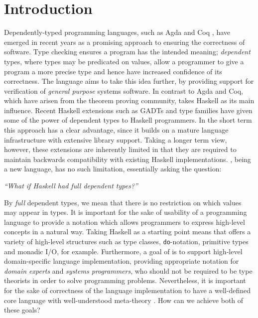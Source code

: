 \section{Introduction}

Dependently-typed programming languages, such as Agda \cite{norell2007thesis}
and Coq \cite{Bertot2004}, have emerged in recent years as a promising approach
to ensuring the correctness of software. Type checking ensures a program has
the intended meaning; \emph{dependent} types, where types may be predicated
on values, allow a programmer to give a program a more precise type and 
hence have increased confidence of its correctness.
The \Idris{} language
\cite{Brady2011a} aims to take this idea further, by providing support for
verification of \emph{general purpose} systems software. In contrast to Agda and Coq,
which have arisen from the theorem proving community, \Idris{} takes Haskell as
its main influence.  Recent Haskell extensions such as GADTs and type families have
given some of the power of dependent types to Haskell programmers. In the short
term this approach has a clear advantage, since it builds on a mature language
infrastructure with extensive library support.
Taking a longer term view, however,
these extensions are inherently limited in that they are required to maintain
backwards compatibility with existing Haskell implementations.  \Idris{}, being a new
language, has no such limitation, essentially asking the question:

\begin{center}
\emph{``What if Haskell had \emph{full} dependent types?''}
\end{center}

By \emph{full} dependent types, we mean that there is no restriction on which
values may appear in types.  It is important for the sake of usability of a
programming language to provide a notation which allows programmers to express
high-level concepts in a natural way. Taking Haskell as a starting point means
that \Idris{} offers a variety of high-level structures such as type 
classes, \texttt{do}-notation, primitive types and monadic I/O, for example.
Furthermore, a goal of \Idris{} is to support high-level domain-specific
language implementation, providing appropriate notation for \emph{domain
experts} and \emph{systems programmers}, who should not be required to be type
theorists in order to solve programming problems.  Nevertheless, it is
important for the sake of correctness of the language implementation to have a
well-defined core language with well-understood meta-theory \cite{Altenkirch2010}. 
How can we achieve both of these goals?

